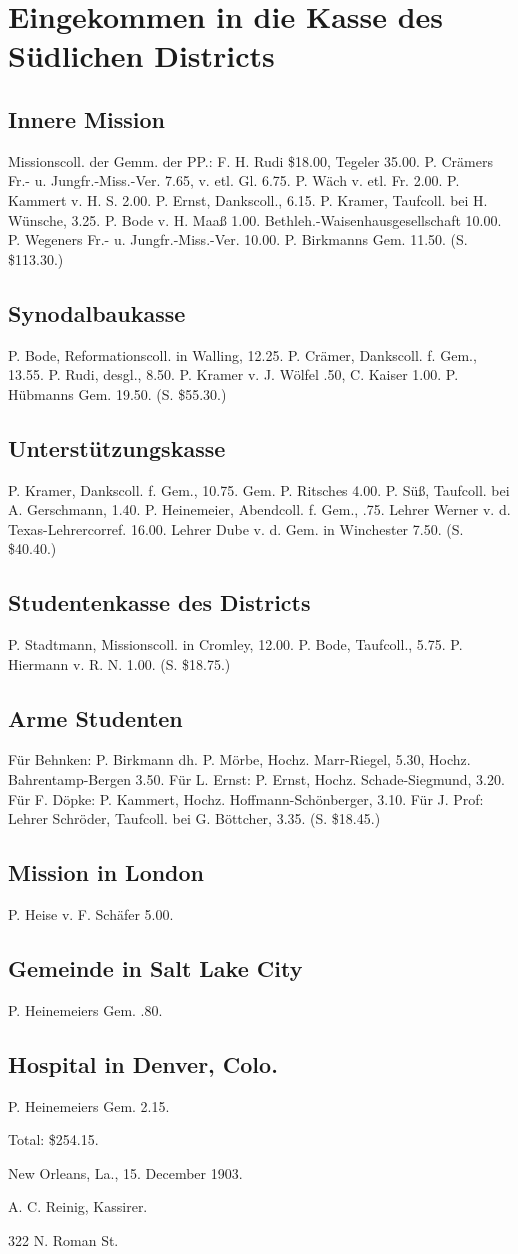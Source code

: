\chapter[Südlicher District]{Eingekommen in die Kasse des Südlichen Districts}

\section{Innere Mission}
Missionscoll. der Gemm. der PP.: F. H. Rudi \$18.00, Tegeler 35.00. P. Crämers Fr.- u. Jungfr.-Miss.-Ver. 7.65, v. etl. Gl. 6.75. P. Wäch v. etl. Fr. 2.00. P. Kammert v. H. S. 2.00. P. Ernst, Dankscoll., 6.15. P. Kramer, Taufcoll. bei H. Wünsche, 3.25. P. Bode v. H. Maaß 1.00. Bethleh.-Waisenhausgesellschaft 10.00. P. Wegeners Fr.- u. Jungfr.-Miss.-Ver. 10.00. P. Birkmanns Gem. 11.50. (S. \$113.30.)

\section{Synodalbaukasse}
P. Bode, Reformationscoll. in Walling, 12.25. P. Crämer, Dankscoll. f. Gem., 13.55. P. Rudi, desgl., 8.50. P. Kramer v. J. Wölfel .50, C. Kaiser 1.00. P. Hübmanns Gem. 19.50. (S. \$55.30.)

\section{Unterstützungskasse}
P. Kramer, Dankscoll. f. Gem., 10.75. Gem. P. Ritsches 4.00. P. Süß, Taufcoll. bei A. Gerschmann, 1.40. P. Heinemeier, Abendcoll. f. Gem., .75. Lehrer Werner v. d. Texas-Lehrercorref. 16.00. Lehrer Dube v. d. Gem. in Winchester 7.50. (S. \$40.40.)

\section{Studentenkasse des Districts}
P. Stadtmann, Missionscoll. in Cromley, 12.00. P. Bode, Taufcoll., 5.75. P. Hiermann v. R. N. 1.00. (S. \$18.75.)

\section{Arme Studenten}
Für Behnken: P. Birkmann dh. P. Mörbe, Hochz. Marr-Riegel, 5.30, Hochz. Bahrentamp-Bergen 3.50. Für L. Ernst: P. Ernst, Hochz. Schade-Siegmund, 3.20. Für F. Döpke: P. Kammert, Hochz. Hoffmann-Schönberger, 3.10. Für J. Prof: Lehrer Schröder, Taufcoll. bei G. Böttcher, 3.35. (S. \$18.45.)

\section{Mission in London}
P. Heise v. F. Schäfer 5.00.

\section{Gemeinde in Salt Lake City}
P. Heinemeiers Gem. .80.

\section{Hospital in Denver, Colo.}
P. Heinemeiers Gem. 2.15.

Total: \$254.15.

New Orleans, La., 15. December 1903.

A. C. Reinig, Kassirer.

322 N. Roman St.
